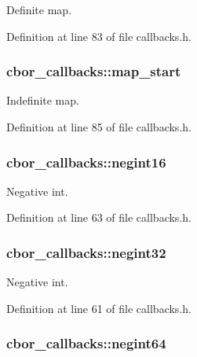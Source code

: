 Definite map. 



Definition at line 83 of file callbacks.\-h.

\hypertarget{structcbor__callbacks_ac833a2232c624936d7444612e47e8a20}{
\subsubsection[{map\-\_\-start}]{ cbor\-\_\-callbacks\-::map\-\_\-start}}\label{structcbor__callbacks_ac833a2232c624936d7444612e47e8a20}


Indefinite map. 



Definition at line 85 of file callbacks.\-h.

\hypertarget{structcbor__callbacks_a0e47df73a7ecf894ab75e04a1cc83dc7}{
\subsubsection[{negint16}]{ cbor\-\_\-callbacks\-::negint16}}\label{structcbor__callbacks_a0e47df73a7ecf894ab75e04a1cc83dc7}


Negative int. 



Definition at line 63 of file callbacks.\-h.

\hypertarget{structcbor__callbacks_a26e8c4f53af47eaaf8928b86fb92a44f}{
\subsubsection[{negint32}]{ cbor\-\_\-callbacks\-::negint32}}\label{structcbor__callbacks_a26e8c4f53af47eaaf8928b86fb92a44f}


Negative int. 



Definition at line 61 of file callbacks.\-h.

\hypertarget{structcbor__callbacks_ac0a4f4915ecb9924132c60c7fe7d93fe}{
\subsubsection[{negint64}]{ cbor\-\_\-callbacks\-::negint64}}\label{structcbor__callbacks_ac0a4f4915ecb9924132c60c7fe7d93fe}


